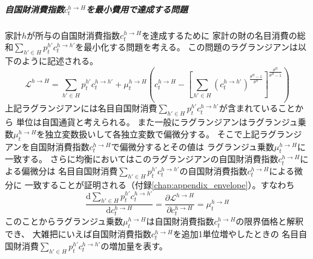 \subparagraph{自国財消費指数\(c_t^{h\to H}\)を最小費用で達成する問題}
\label{sec:model_households_indices_aggregation_stage1a_home_c_h_H_problem}
家計\(h\)が所与の自国財消費指数\(c_t^{h\to H}\)を達成するために
家計の財の名目消費の総和\(\sum_{h'\in H}p_t^{h'}c_t^{h\to h'}\)を最小化する問題を考える。
この問題のラグランジアンは以下のように記述される。
\begin{equation}
\label{form:model_households_indices_aggregation_stage1a_home_c_h_H_problem_lagrangian_def}
    \mathcal{L}^{h\to H}=\sum_{h'\in H}p_t^{h'}c_t^{h\to h'}+\mu_t^{h\to H}\left(c_t^{h\to H}-\left[\sum_{h'\in H}(c_t^{h\to h'})^{\frac{\theta^H-1}{\theta^H}}\right]^{\frac{\theta^H}{\theta^H-1}}\right)
\end{equation}
上記ラグランジアンには名目自国財消費\(\sum_{h'\in H}p_t^{h'}c_t^{h\to h'}\)が含まれていることから
単位は自国通貨と考えられる。
また一般にラグランジアンはラグランジュ乗数\(\mu_t^{h\to H}\)を独立変数扱いして各独立変数で偏微分する。
そこで上記ラグランジアンを自国財消費指数\(c_t^{h\to H}\)で偏微分するとその値は
ラグランジュ乗数\(\mu_t^{h\to H}\)に一致する。
さらに均衡においてはこのラグランジアンの自国財消費指数\(c_t^{h\to H}\)による偏微分は
名目自国財消費\(\sum_{h'\in H}p_t^{h'}c_t^{h\to h'}\)の自国財消費指数\(c_t^{h\to H}\)による微分に
一致することが証明される（付録\eqref{chap:appendix_envelope}）。すなわち
\begin{equation}
\label{form:model_households_indices_aggregation_stage1a_home_c_h_H_problem_mu_h_H_marginal_eq}
    \frac{\mathrm{d}\sum_{h'\in H}p_t^{h'}c_t^{h\to h'}}{\mathrm{d}c_t^{h\to H}}=\frac{\partial \mathcal{L}^{h\to H}}{\partial c_t^{h\to H}}=\mu_t^{h\to H}
\end{equation}
このことからラグランジュ乗数\(\mu_t^{h\to H}\)は自国財消費指数\(c_t^{h\to H}\)の限界価格と解釈でき、
大雑把にいえば自国財消費指数\(c_t^{h\to H}\)を追加1単位増やしたときの
名目自国財消費\(\sum_{h'\in H}p_t^{h'}c_t^{h\to h'}\)の増加量を表す。

